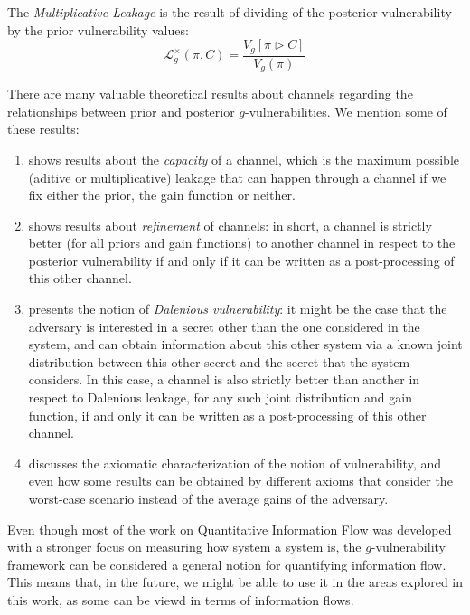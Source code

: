 \begin{definition}
The \emph{Multiplicative Leakage} is the result of dividing of the posterior vulnerability by the prior vulnerability values:
$$\mathcal{L}_g^\times(\pi,C) = \frac{V_g[\pi\triangleright C]}{V_g(\pi)}$$
\end{definition}

There are many valuable theoretical results about channels regarding the relationships between prior and posterior $g$-vulnerabilities. We mention some of these results:

\begin{enumerate}
\item \cite[Chapter~7]{QIF} shows results about the \emph{capacity} of a channel, which is the maximum possible (aditive or multiplicative) leakage that can happen through a channel if we fix either the prior, the gain function or neither.
\item \cite[Chapter~9]{QIF} shows results about \emph{refinement} of channels: in short, a channel is strictly better (for all priors and gain functions) to another channel in respect to the posterior vulnerability if and only if it can be written as a post-processing of this other channel.
\item \cite[Chapter~10]{QIF} presents the notion of \emph{Dalenious vulnerability}: it might be the case that the adversary is interested in a secret other than the one considered in the system, and can obtain information about this other system via a known joint distribution between this other secret and the secret that the system considers. In this case, a channel is also strictly better than another in respect to Dalenious leakage, for any such joint distribution and gain function, if and only it can be written as a post-processing of this other channel.
\item \cite[Chapter~11]{QIF} discusses the axiomatic characterization of the notion of vulnerability, and even how some results can be obtained by different axioms that consider the worst-case scenario instead of the average gains of the adversary.
\end{enumerate}

Even though most of the work on Quantitative Information Flow was developed with a stronger focus on measuring how system a system is, the $g$-vulnerability framework can be considered a general notion for quantifying information flow. This means that, in the future, we might be able to use it in the areas explored in this work, as some can be viewd in terms of information flows.
